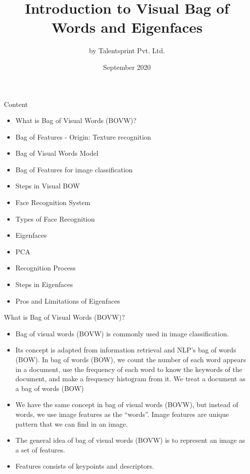 \documentclass{beamer}
\title{Introduction to Visual Bag of Words and Eigenfaces}
\author{by Talentsprint Pvt. Ltd.}
\date{September 2020}
\begin{document}
\maketitle
\begin{frame}{Content}
	\begin{itemize}
		\item What is Bag of Visual Words (BOVW)?
		\item Bag of Features - Origin: Texture recognition
		\item Bag of Visual Words Model
		\item Bag of Features for image classification
		\item Steps in Visual BOW
		\item Face Recognition System
		\item Types of Face Recognition
		\item Eigenfaces
		\item PCA
		\item Recognition Process
		\item Steps in Eigenfaces
		\item Pros and Limitations of Eigenfaces
	\end{itemize}
\end{frame}

\begin{frame}{What is Bag of Visual Words (BOVW)?}
	\begin{flushleft}
		\begin{itemize}
			\item Bag of visual words (BOVW) is commonly used in image classification.
			\item Its concept is adapted from information retrieval and NLP’s bag of words (BOW). In bag of words (BOW), we count the number of each word appears in a document, use the frequency of each word to know the keywords of the document, and make a frequency histogram from it. We treat a document as a bag of words (BOW)
			\item We have the same concept in bag of visual words (BOVW), but instead of words, we use image features as the “words”. Image features are unique pattern that we can find in an image.
			\item The general idea of bag of visual words (BOVW) is to represent an image as a set of features.
			\item  Features consists of keypoints and descriptors.
		\end{itemize}
	\end{flushleft}
\end{frame}
\end{document}
